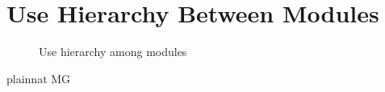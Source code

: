 \documentclass[12pt, titlepage]{article}
\begin{document}
\section{Use Hierarchy Between Modules} \label{SecUse}


\begin{figure}[H]
\centering
\caption{Use hierarchy among modules}
\label{FigUH}
\end{figure}


 {plainnat}
 {MG}
\end{document}
